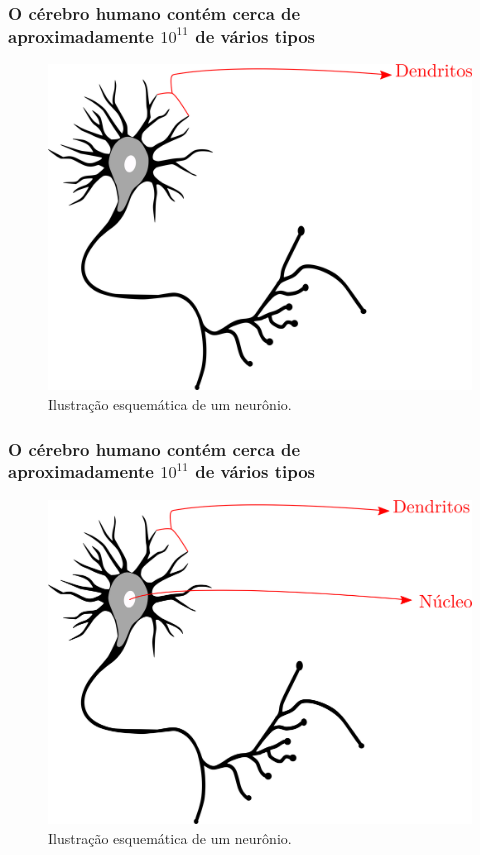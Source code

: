 \documentclass[10pt]{beamer} %
\begin{document}
\begin{frame}
	\frametitle{O cérebro humano contém cerca de \\ aproximadamente $10^{11}$   de vários tipos}
	\begin{figure}
		\centering
		\includegraphics[scale=0.2]{Imagens/dendrito.png} 
		\caption{Ilustração esquemática de um neurônio.}
	\end{figure}
\end{frame}

\begin{frame}
	\frametitle{O cérebro humano contém cerca de \\ aproximadamente $10^{11}$   de vários tipos}
	\begin{figure}
		\centering
		\includegraphics[scale=0.2]{Imagens/nucleo.png} 
		\caption{Ilustração esquemática de um neurônio.}
	\end{figure}
\end{frame}
\end{document}
